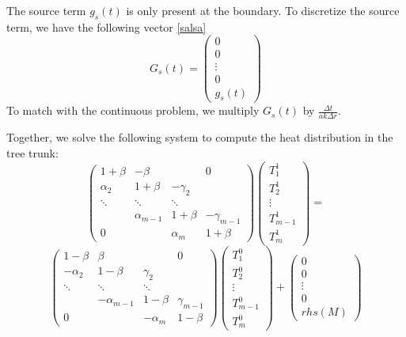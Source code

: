 \documentclass[12pt]{article}
\begin{document}
The source term $g_s(t)$ is only present at the boundary. To discretize the source term, we have the following vector \ref{salsa}
\begin{equation}
G_s(t)=
\begin{pmatrix}
0\\
0\\
\vdots\\
0\\
g_s(t)
\end{pmatrix}
\end{equation}
To match with the continuous problem, we multiply $G_s(t)$ by $\frac{\Delta t}{ak\Delta r}$. 


Together, we solve the following system to compute the heat distribution in the tree trunk: %
\begin{equation*}
    \left( \begin{array}{cccc}
1+\beta & -\beta & & 0\\
\alpha_2 & 1+\beta & -\gamma_2 & \\
\ddots& \ddots & \ddots  & \\
& \alpha_{m-1} & 1+\beta & -\gamma_{m-1} \\
0 & & \alpha_m & 1+\beta \end{array} \right)\left(\begin{array}{c}
     T^1_1  \\
     T^1_2 \\
     \vdots\\
     T^1_{m-1}\\
     T^1_m
\end{array}\right)=\end{equation*}
\begin{equation}\left( \begin{array}{cccc}
1-\beta & \beta & & 0\\
-\alpha_2 & 1-\beta & \gamma_2 & \\
\ddots& \ddots & \ddots  & \\
& -\alpha_{m-1} & 1-\beta & \gamma_{m-1} \\
0 & & -\alpha_m & 1-\beta \end{array} \right)\left(\begin{array}{c}
     T^0_1  \\
     T^0_2 \\
     \vdots\\
     T^0_{m-1}\\
     T^0_m
\end{array}\right)+\left(\begin{array}{c}
     0  \\
     0 \\
     \vdots\\
     0\\
     rhs(M)
\end{array}\right)
\end{equation}
\end{document}
